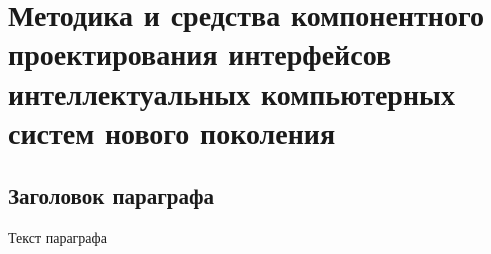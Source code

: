 \chapter{Методика и средства компонентного проектирования интерфейсов интеллектуальных компьютерных систем нового поколения}
\label{chapter_ui_design}


\section{Заголовок параграфа}
Текст параграфа

%